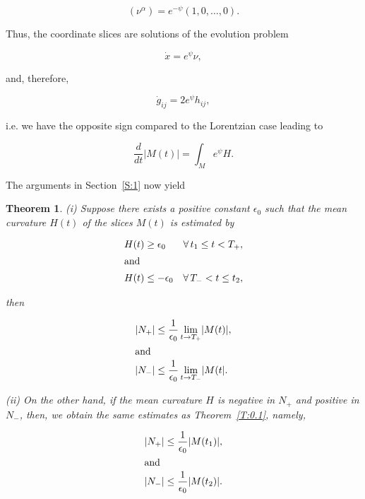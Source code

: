 \documentclass[ a4paper, oneside]{amsart}
\newcommand{\al}{\alpha}
\newcommand{\e}{\epsilon}
\newcommand\ra{\rightarrow}
\newcommand{\A}{\forall}
\newcommand{\abs}[1]{\lvert#1\rvert}
\newcommand{\tup}{\textup}%
\newcommand{\bt}{\begin{thm}}
\newcommand{\et}{\end{thm}}
\newcommand\nd{\noindent}
\newcommand\cvm{\vspace\Cmedskipamount}
\newcommand\cvb{\vspace\Cbigskipamount}
\newcommand{\rs}[1]{Section~\ref{S:#1}}
\newcommand{\rt}[1]{Theorem~\ref{T:#1}}
\theoremstyle{plain}
\newtheorem{thm}{Theorem}[section]
\theoremstyle{definition}
\theoremstyle{remark}
\numberwithin{equation}{section}
\begin{document}
\begin{equation}
(\nu^\al)=e^{-\psi}(1,0,\ldots,0).
\end{equation}


\cvm
Thus, the coordinate slices are solutions of the evolution problem

\begin{equation}
\dot x=e^\psi \nu,
\end{equation}

\cvm
\nd and, therefore,

\begin{equation}
\dot g_{ij}=2e^\psi h_{ij},
\end{equation}

\cvm
\nd i.e. we have the opposite sign compared to the Lorentzian case leading to

\begin{equation}
\frac d{dt}\abs{M(t)}=\int_Me^\psi H.
\end{equation}

\cvm
The arguments in \rs{1} now yield

\bt
\tup{(i)} Suppose there exists a positive constant $\e_0$ such that the mean
curvature $H(t)$ of the slices $M(t)$ is estimated by

\begin{align}
H(t)&\ge \e_0&\A\,t_1\le t< T_+&,\\
\intertext{and}
H(t)&\le-\e_0&\A\,T_-<t\le t_2&,
\end{align}

\cvm
\nd then

\begin{align}
\abs{N_+}&\le \frac1{\e_0}\lim_{t\ra T_+}\abs{M(t)},\\
\intertext{and}
\abs{N_-}&\le \frac1{\e_0}\lim_{t\ra T_-}\abs{M(t}.
\end{align}

\cvm
\tup{(ii)} On the other hand, if the mean curvature $H$ is negative in $N_+$ and
positive in $N_-$, then, we obtain the same estimates as \rt{0.1}, namely,

\begin{align}
\abs{N_+}&\le \frac1{\e_0}\abs{M(t_1)},\\
\intertext{and}
\abs{N_-}&\le \frac1{\e_0}\abs{M(t_2)}.
\end{align}
\et

\cvb
\end{document}
